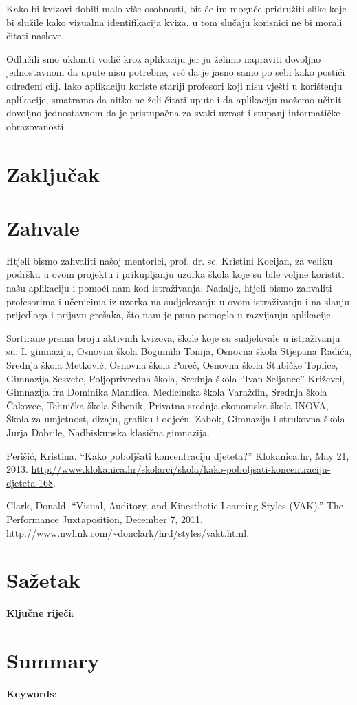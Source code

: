 \documentclass{scrreprt}
\begin{document}
Kako bi kvizovi dobili malo više osobnosti, bit će im moguće pridružiti slike
koje bi služile kako vizualna identifikacija kviza, u tom slučaju korisnici ne
bi morali čitati naslove.

Odlučili smo ukloniti vodič kroz aplikaciju jer ju želimo napraviti dovoljno
jednostavnom da upute nisu potrebne, već da je jasno samo po sebi kako postići
određeni cilj. Iako aplikaciju koriste stariji profesori koji nisu vješti u
korištenju aplikacije, smatramo da nitko ne želi čitati upute i da aplikaciju
možemo učinit dovoljno jednostavnom da je pristupačna za svaki uzrast i stupanj
informatičke obrazovanosti.

\chapter{Zaključak}

\chapter{Zahvale}

Htjeli bismo zahvaliti našoj mentorici, prof. dr. sc. Kristini Kocijan, za
veliku podršku u ovom projektu i prikupljanju uzorka škola koje su bile voljne
koristiti našu aplikaciju i pomoći nam kod istraživanja. Nadalje, htjeli bismo
zahvaliti profesorima i učenicima iz uzorka na sudjelovanju u ovom istraživanju
i na slanju prijedloga i prijavu grešaka, što nam je puno pomoglo u razvijanju
aplikacije.

Sortirane prema broju aktivnih kvizova, škole koje su sudjelovale u istraživanju
su: I. gimnazija, Osnovna škola Bogumila Tonija, Osnovna škola Stjepana Radića,
Srednja škola Metković, Osnovna škola Poreč, Osnovna škola Stubičke Toplice,
Gimnazija Sesvete, Poljoprivredna škola, Srednja škola ``Ivan Seljanec''
Križevci, Gimnazija fra Dominika Mandica, Medicinska škola Varaždin, Srednja
škola Čakovec, Tehnička škola Šibenik, Privatna srednja ekonomska škola INOVA,
Škola za umjetnost, dizajn, grafiku i odjeću, Zabok, Gimnazija i strukovna
škola Jurja Dobrile, Nadbiskupska klasična gimnazija.

\listoffigures

\renewcommand{\bibname}{Popis literature}

\begin{thebibliography}{9}

   Perišić, Kristina. “Kako poboljšati koncentraciju djeteta?”
    Klokanica.hr, May 21, 2013.
    \url{http://www.klokanica.hr/skolarci/skola/kako-poboljsati-koncentraciju-djeteta-168}.

   Clark, Donald. “Visual, Auditory, and Kinesthetic Learning
    Styles (VAK).” The Performance Juxtaposition, December 7, 2011.
    \url{http://www.nwlink.com/~donclark/hrd/styles/vakt.html}.

\end{thebibliography}

\chapter{Sažetak}

\textbf{Ključne riječi}:

\chapter{Summary}

\textbf{Keywords}:
\end{document}
